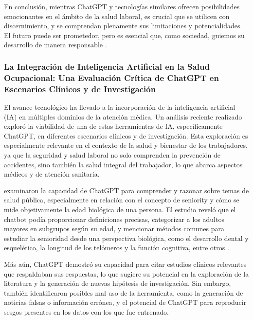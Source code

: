 En conclusión, mientras ChatGPT y tecnologías similares ofrecen posibilidades emocionantes en el ámbito de la salud laboral, es crucial que se utilicen con discernimiento, y se comprendan plenamente sus limitaciones y potencialidades. El futuro puede ser prometedor, pero es esencial que, como sociedad, guiemos su desarrollo de manera responsable \citep{Kleesiek2023AnOnly}.



\subsubsection{La Integración de Inteligencia Artificial en la Salud Ocupacional: Una Evaluación Crítica de ChatGPT en Escenarios Clínicos y de Investigación}
El avance tecnológico ha llevado a la incorporación de la inteligencia artificial (IA) en múltiples dominios de la atención médica. Un análisis reciente realizado \citet{Cascella2023EvaluatingScenarios} exploró la viabilidad de una de estas herramientas de IA, específicamente ChatGPT, en diferentes escenarios clínicos y de investigación. Esta exploración es especialmente relevante en el contexto de la salud y bienestar de los trabajadores, ya que la seguridad y salud laboral no solo comprenden la prevención de accidentes, sino también la salud integral del trabajador, lo que abarca aspectos médicos y de atención sanitaria.

\citet{Cascella2023EvaluatingScenarios} examinaron la capacidad de ChatGPT para comprender y razonar sobre temas de salud pública, especialmente en relación con el concepto de seniority y cómo se mide objetivamente la edad biológica de una persona. El estudio reveló que el chatbot podía proporcionar definiciones precisas, categorizar a los adultos mayores en subgrupos según su edad, y mencionar métodos comunes para estudiar la senioridad desde una perspectiva biológica, como el desarrollo dental y esquelético, la longitud de los telómeros y la función cognitiva, entre otros \citep{Cascella2023EvaluatingScenarios}.

Más aún, ChatGPT demostró su capacidad para citar estudios clínicos relevantes que respaldaban sus respuestas, lo que sugiere su potencial en la exploración de la literatura y la generación de nuevas hipótesis de investigación. Sin embargo, \citet{Cascella2023EvaluatingScenarios} también identificaron posibles mal uso de la herramienta, como la generación de noticias falsas o información errónea, y el potencial de ChatGPT para reproducir sesgos presentes en los datos con los que fue entrenado.

